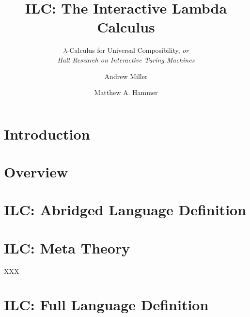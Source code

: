 \documentclass{llncs}
\title{ILC: The Interactive Lambda Calculus}
\subtitle{$\lambda$-Calculus for Universal Composibility, \emph{or}
  \\
  \emph{Halt Research on Interactive Turing Machines}
}
\author{Andrew Miller\inst{1} \and Matthew A. Hammer\inst{2}}
\institute{University of Illinois \and University of Colorado Boulder}
\begin{document}
\maketitle

\begin{abstract}

\end{abstract}

\section{Introduction}

\section{Overview}

\section{ILC: Abridged Language Definition}

\section{ILC: Meta Theory}

\begin{theorem}
\label{thm:read-det}
XXX
\end{theorem}


\appendix
\section{ILC: Full Language Definition}
\end{document}
